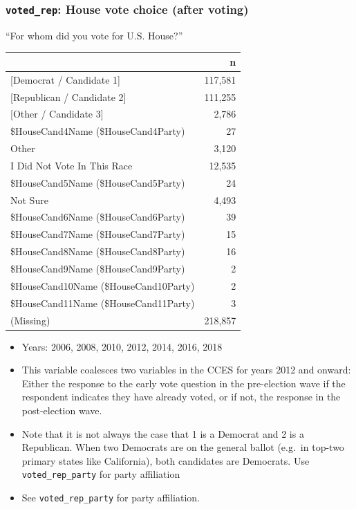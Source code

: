 \documentclass[10pt,article,oneside]{memoir}
\theoremstyle{definition}
\begin{document}
\hypertarget{voted_rep-house-vote-choice-after-voting}{%
\subsubsection{\texorpdfstring{\texttt{voted\_rep}: House vote choice
(after
voting)}{voted\_rep: House vote choice (after voting)}}\label{voted_rep-house-vote-choice-after-voting}}

``For whom did you vote for U.S. House?''

\begin{table}[H]
\centering
\begin{tabular}{lr}
\toprule
 & n\\
\midrule
{[Democrat / Candidate 1]} & 117,581\\
{[Republican / Candidate 2]} & 111,255\\
{[Other / Candidate 3]} & 2,786\\
\$HouseCand4Name (\$HouseCand4Party) & 27\\
Other & 3,120\\
I Did Not Vote In This Race & 12,535\\
\$HouseCand5Name (\$HouseCand5Party) & 24\\
Not Sure & 4,493\\
\$HouseCand6Name (\$HouseCand6Party) & 39\\
\$HouseCand7Name (\$HouseCand7Party) & 15\\
\$HouseCand8Name (\$HouseCand8Party) & 16\\
\$HouseCand9Name (\$HouseCand9Party) & 2\\
\$HouseCand10Name (\$HouseCand10Party) & 2\\
\$HouseCand11Name (\$HouseCand11Party) & 3\\
(Missing) & 218,857\\
\bottomrule
\end{tabular}
\end{table}

\begin{itemize}
\tightlist
\item
  Years: 2006, 2008, 2010, 2012, 2014, 2016, 2018
\item
  This variable coalesces two variables in the CCES for years 2012 and
  onward: Either the response to the early vote question in the
  pre-election wave if the respondent indicates they have already voted,
  or if not, the response in the post-election wave.
\item
  Note that it is not always the case that 1 is a Democrat and 2 is a
  Republican. When two Democrats are on the general ballot (e.g.~in
  top-two primary states like California), both candidates are
  Democrats. Use \texttt{voted\_rep\_party} for party affiliation
\item
  See \texttt{voted\_rep\_party} for party affiliation.
\end{itemize}
\end{document}
